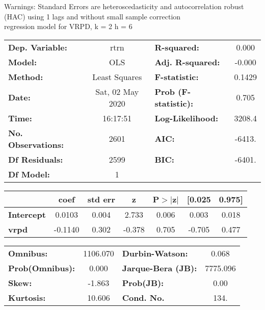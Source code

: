 Warnings: \newline
 [1] Standard Errors are heteroscedasticity and autocorrelation robust (HAC) using 1 lags and without small sample correction\\ 

regression model for VRPD, k = 2 h = 6\begin{center}
\begin{tabular}{lclc}
\toprule
\textbf{Dep. Variable:}    &       rtrn       & \textbf{  R-squared:         } &     0.000   \\
\textbf{Model:}            &       OLS        & \textbf{  Adj. R-squared:    } &    -0.000   \\
\textbf{Method:}           &  Least Squares   & \textbf{  F-statistic:       } &    0.1429   \\
\textbf{Date:}             & Sat, 02 May 2020 & \textbf{  Prob (F-statistic):} &    0.705    \\
\textbf{Time:}             &     16:17:51     & \textbf{  Log-Likelihood:    } &    3208.4   \\
\textbf{No. Observations:} &        2601      & \textbf{  AIC:               } &    -6413.   \\
\textbf{Df Residuals:}     &        2599      & \textbf{  BIC:               } &    -6401.   \\
\textbf{Df Model:}         &           1      & \textbf{                     } &             \\
\bottomrule
\end{tabular}
\begin{tabular}{lcccccc}
                   & \textbf{coef} & \textbf{std err} & \textbf{z} & \textbf{P$> |$z$|$} & \textbf{[0.025} & \textbf{0.975]}  \\
\midrule
\textbf{Intercept} &       0.0103  &        0.004     &     2.733  &         0.006        &        0.003    &        0.018     \\
\textbf{vrpd}      &      -0.1140  &        0.302     &    -0.378  &         0.705        &       -0.705    &        0.477     \\
\bottomrule
\end{tabular}
\begin{tabular}{lclc}
\textbf{Omnibus:}       & 1106.070 & \textbf{  Durbin-Watson:     } &    0.068  \\
\textbf{Prob(Omnibus):} &   0.000  & \textbf{  Jarque-Bera (JB):  } & 7775.096  \\
\textbf{Skew:}          &  -1.863  & \textbf{  Prob(JB):          } &     0.00  \\
\textbf{Kurtosis:}      &  10.606  & \textbf{  Cond. No.          } &     134.  \\
\bottomrule
\end{tabular}
\end{center}


